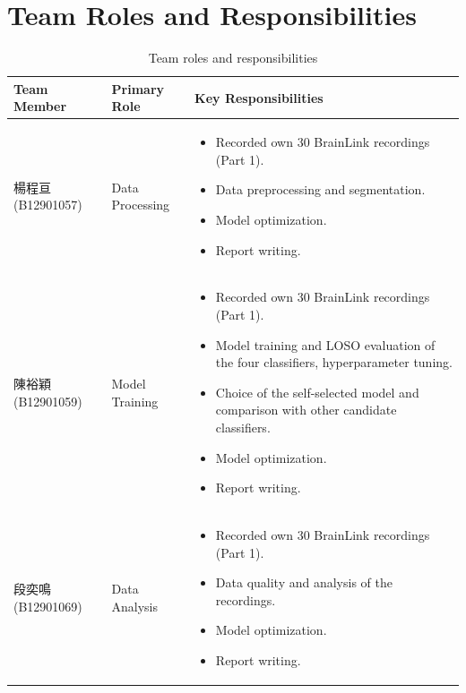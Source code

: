 \section{Team Roles and Responsibilities}\label{sec:team_roles}

\begin{table}[H]
\centering
\caption{Team roles and responsibilities}
\label{tab:team_roles}
\begin{tabularx}{\textwidth}{@{} l l X @{}}
\toprule
\textbf{Team Member} & \textbf{Primary Role} & \textbf{Key Responsibilities} \\
\midrule
楊程亘 (B12901057) & Data Processing &
    \begin{minipage}[t]{\linewidth}\raggedright\begin{itemize}[leftmargin=*, topsep=0pt, partopsep=0pt, noitemsep]
        \item Recorded own 30 BrainLink recordings (Part 1).
        \item Data preprocessing and segmentation.
        \item Model optimization.
        \item Report writing.
    \end{itemize}\end{minipage} \\
\addlinespace

陳裕穎 (B12901059) & Model Training &
    \begin{minipage}[t]{\linewidth}\raggedright\begin{itemize}[leftmargin=*, topsep=0pt, partopsep=0pt, noitemsep]
        \item Recorded own 30 BrainLink recordings (Part 1).
        \item Model training and LOSO evaluation of the four classifiers, hyperparameter tuning.
        \item Choice of the self-selected model and comparison with other candidate classifiers.
        \item Model optimization.
        \item Report writing.
    \end{itemize}\end{minipage} \\
\addlinespace

段奕鳴 (B12901069) & Data Analysis &
    \begin{minipage}[t]{\linewidth}\raggedright\begin{itemize}[leftmargin=*, topsep=0pt, partopsep=0pt, noitemsep]
        \item Recorded own 30 BrainLink recordings (Part 1).
        \item Data quality and analysis of the recordings.
        \item Model optimization.
        \item Report writing.
    \end{itemize}\end{minipage} \\
\bottomrule
\end{tabularx}
\end{table}
